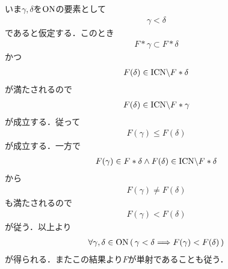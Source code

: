 	\begin{sketch}
		いま$\gamma,\delta$を$\mathrm{ON}$の要素として
		\begin{align}
			\gamma < \delta
		\end{align}
		であると仮定する．このとき
		\begin{align}
			F \ast \gamma \subset F \ast \delta
		\end{align}
		かつ
		\begin{align}
			F(\delta) \in \mathrm{ICN} \backslash F \ast \delta
		\end{align}
		が満たされるので
		\begin{align}
			F(\delta) \in \mathrm{ICN} \backslash F \ast \gamma
		\end{align}
		が成立する．従って
		\begin{align}
			F(\gamma) \leq F(\delta)
		\end{align}
		が成立する．一方で
		\begin{align}
			F(\gamma) \in F \ast \delta \wedge
			F(\delta) \in \mathrm{ICN} \backslash F \ast \delta
		\end{align}
		から
		\begin{align}
			F(\gamma) \neq F(\delta)
		\end{align}
		も満たされるので
		\begin{align}
			F(\gamma) < F(\delta)
		\end{align}
		が従う．以上より
		\begin{align}
			\forall \gamma, \delta \in \mathrm{ON}\, (\, \gamma < \delta \Longrightarrow F(\gamma) < F(\delta)\, )
		\end{align}
		が得られる．またこの結果より$F$が単射であることも従う．
	\end{sketch}
	
	\begin{screen}
		\begin{thm}[Zornの補題]
		\end{thm}
	\end{screen}